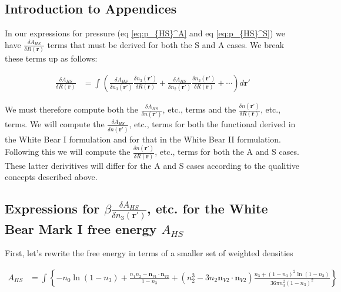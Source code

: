 \documentclass[letterpaper,twocolumn,amsmath,amssymb,jcp,10pt,aip]{revtex4-1}
\begin{document}
\begin{widetext}

\section*{Introduction to Appendices}

In our expressions for pressure (eq \ref{eq:p_{HS}^A} and eq \ref{eq:p_{HS}^S}) we have $\frac{\delta A_{HS}}{\delta R(\mathbf{r})}$ terms that must be derived for both the S and A cases.  We break these terms up as follows:   

  \begin{align}
    \frac{\delta A_{HS}}{\delta R(\mathbf{r})} &=
    \int \left(
    \frac{\delta A_{HS}}{\delta n_3(\mathbf{r}')}
    \frac{\delta n_3(\mathbf{r}')}{\delta R(\mathbf{r})}
    +
    \frac{\delta A_{HS}}{\delta n_2(\mathbf{r}')}
    \frac{\delta n_2(\mathbf{r}')}{\delta R(\mathbf{r})}
    + \cdots
    \right) d\mathbf{r}'
  \end{align}
 

We must therefore compute both the $\frac{\delta A_{HS}}{\delta n(\mathbf{r}')}$, etc., terms and the $\frac{\delta n(\mathbf{r}')}{\delta R(\mathbf{r})}$, etc., terms.  We will compute the $\frac{\delta A_{HS}}{\delta n(\mathbf{r}')}$, etc., terms for both the functional derived in the White Bear I formulation and for that in the White Bear II formulation.  Following this we will compute the $\frac{\delta n(\mathbf{r}')}{\delta R(\mathbf{r})}$, etc., terms for both the A and S cases.  These latter derivitives will differ for the A and S cases according to the qualitive concepts described above. 

\subsection{Expressions for $\beta\frac{\delta A_{HS}}{\delta n_3(\mathbf{r}')}$, etc. for the White Bear Mark I free energy $A_{HS}$}

  First, let's rewrite the free energy in terms of a smaller set of weighted densities
  
  \begin{align}
    A_{HS} &= \int \left\{
    -n_0 \ln\left( 1 - n_3\right)
    + \frac{n_1 n_2 - \mathbf{n}_{V1} \cdot\mathbf{n}_{V2}}{1-n_3}
    + (n_2^3 - 3 n_2 \mathbf{n}_{V2} \cdot \mathbf{n}_{V2}) \frac{
      n_3 + (1-n_3)^2 \ln(1-n_3)
    }{
      36\pi n_3^2(1-n_3)^2
    }
    \right\}
  \end{align}
  

\end{widetext}
\end{document}
